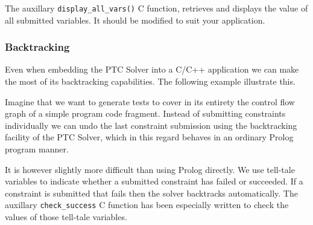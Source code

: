 \documentclass{article}
\begin{document}
The auxillary \verb+display_all_vars()+ C function, retrieves and displays the
value of
all submitted variables. It should be modified to suit your application.

\subsubsection{Backtracking}

Even when embedding the PTC Solver into a C/C++ application we can make the
most of its backtracking capabilities. The following example illustrate this.

Imagine that we want to generate tests to cover in its entirety the control flow
graph of a simple program code fragment. Instead of submitting constraints
individually we can undo the last constraint submission using the backtracking
facility of the PTC Solver, which in this regard behaves in an ordinary Prolog
program manner.

It is however slightly more difficult than using Prolog
directly. We use tell-tale variables to indicate whether a submitted constraint
has failed or succeeded. If a constraint is submitted that fails then the solver
backtracks automatically. The auxillary \verb+check_success+ C function has been
especially written to check the values of those tell-tale variables.
\end{document}
